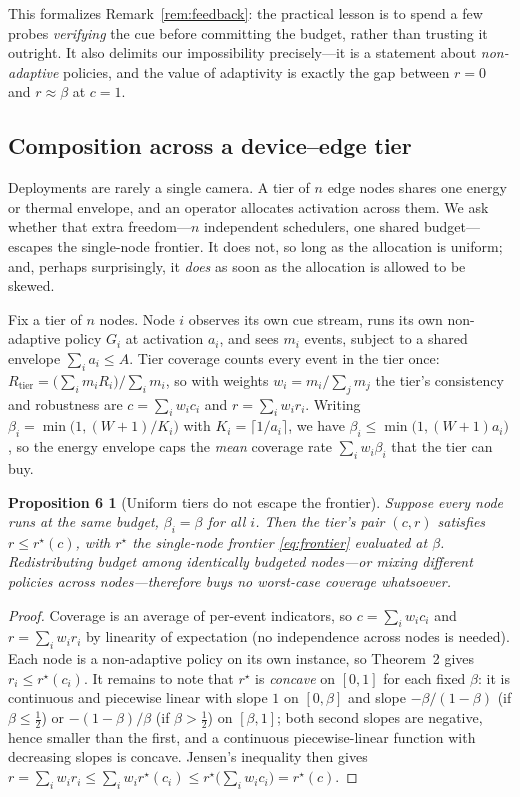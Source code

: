 ﻿\documentclass[lettersize,journal]{IEEEtran}
\newtheorem*{propsix}{Proposition 6}
\begin{document}
\noindent This formalizes Remark~\ref{rem:feedback}: the practical lesson is to spend a few probes \emph{verifying} the cue before committing the budget, rather than trusting it outright. It also delimits our impossibility precisely---it is a statement about \emph{non-adaptive} policies, and the value of adaptivity is exactly the gap between $r=0$ and $r\approx\beta$ at $c=1$.

\subsection{Composition across a device--edge tier}\label{sec:fleet}
Deployments are rarely a single camera. A tier of $n$ edge nodes shares one energy or thermal envelope, and an operator allocates activation across them. We ask whether that extra freedom---$n$ independent schedulers, one shared budget---escapes the single-node frontier. It does not, so long as the allocation is uniform; and, perhaps surprisingly, it \emph{does} as soon as the allocation is allowed to be skewed.

Fix a tier of $n$ nodes. Node $i$ observes its own cue stream, runs its own non-adaptive policy $G_i$ at activation $a_i$, and sees $m_i$ events, subject to a shared envelope $\sum_i a_i\le A$. Tier coverage counts every event in the tier once: $R_{\text{tier}}=\big(\sum_i m_i R_i\big)/\sum_i m_i$, so with weights $w_i=m_i/\sum_j m_j$ the tier's consistency and robustness are $c=\sum_i w_i c_i$ and $r=\sum_i w_i r_i$. Writing $\beta_i=\min\!\big(1,(W{+}1)/K_i\big)$ with $K_i=\lceil 1/a_i\rceil$, we have $\beta_i\le\min\!\big(1,(W{+}1)a_i\big)$, so the energy envelope caps the \emph{mean} coverage rate $\sum_i w_i\beta_i$ that the tier can buy.

\begin{propsix}[Uniform tiers do not escape the frontier]
Suppose every node runs at the same budget, $\beta_i=\beta$ for all $i$. Then the tier's pair $(c,r)$ satisfies $r\le r^\star(c)$, with $r^\star$ the single-node frontier \eqref{eq:frontier} evaluated at $\beta$. Redistributing budget among identically budgeted nodes---or mixing different policies across nodes---therefore buys no worst-case coverage whatsoever.
\end{propsix}
\begin{proof}
Coverage is an average of per-event indicators, so $c=\sum_i w_ic_i$ and $r=\sum_i w_ir_i$ by linearity of expectation (no independence across nodes is needed). Each node is a non-adaptive policy on its own instance, so Theorem~2 gives $r_i\le r^\star(c_i)$. It remains to note that $r^\star$ is \emph{concave} on $[0,1]$ for each fixed $\beta$: it is continuous and piecewise linear with slope $1$ on $[0,\beta]$ and slope $-\beta/(1-\beta)$ (if $\beta\le\tfrac12$) or $-(1-\beta)/\beta$ (if $\beta>\tfrac12$) on $[\beta,1]$; both second slopes are negative, hence smaller than the first, and a continuous piecewise-linear function with decreasing slopes is concave. Jensen's inequality then gives $r=\sum_i w_ir_i\le\sum_i w_i r^\star(c_i)\le r^\star\big(\sum_i w_ic_i\big)=r^\star(c)$.
\end{proof}
\end{document}
